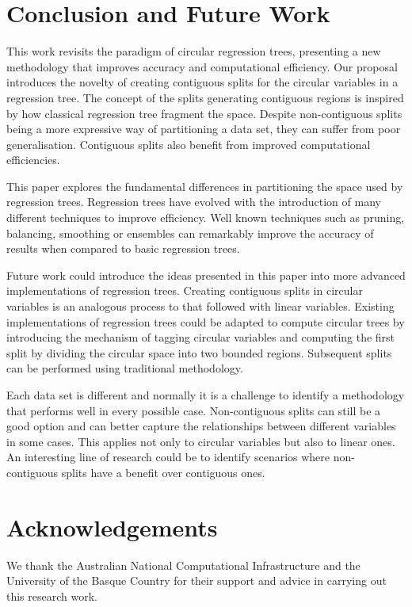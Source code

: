 \documentclass[times,twocolumn,final,authoryear]{elsarticle}
\begin{document}
\section{Conclusion and Future Work}
\label{sec:5}
This work revisits the paradigm of circular regression trees, presenting a new methodology that improves accuracy and computational efficiency. Our proposal introduces the novelty of creating contiguous splits for the circular variables in a regression tree. The concept of the splits generating contiguous regions is inspired by how classical regression tree fragment the space. Despite non-contiguous splits being a more expressive way of partitioning a data set, they can suffer from poor generalisation. Contiguous splits also benefit from improved computational efficiencies.

This paper explores the fundamental differences in partitioning the space used by regression trees. Regression trees have evolved with the introduction of many different techniques to improve efficiency. Well known techniques such as pruning, balancing, smoothing \citep{Breimanetal1984, Quinlan1993} or ensembles \citep{Buhlmann2012} can remarkably improve the accuracy of results when compared to basic regression trees.

Future work could introduce the ideas presented in this paper into more advanced implementations of regression trees. Creating contiguous splits in circular variables is an analogous process to that followed with linear variables. Existing implementations of regression trees could be adapted to compute circular trees by introducing the mechanism of tagging circular variables and computing the first split by dividing the circular space into two bounded regions. Subsequent splits can be performed using traditional methodology.

Each data set is different and normally it is a challenge to identify a methodology that performs well in every possible case. Non-contiguous splits can still be a good option and can better capture the relationships between different variables in some cases. This applies not only to circular variables but also to linear ones. An interesting line of research could be to identify scenarios where non-contiguous splits have a benefit over contiguous ones.


\section*{Acknowledgements}

We thank the Australian National Computational Infrastructure and the University of the Basque Country for their support and advice in carrying out this research work.
\end{document}
